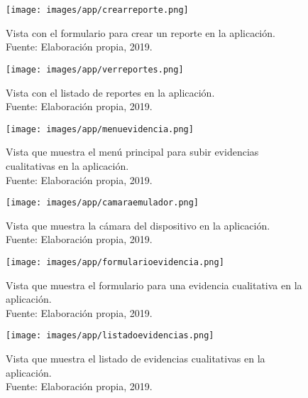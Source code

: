 \begin{figure}[H]
	\centering
	\captionsetup{justification=centering}
	\texttt{[image: images/app/crearreporte.png]}
	\caption[Vista con el formulario para crear un reporte en la aplicación.]{{Vista con el formulario para crear un reporte en la aplicación.\\Fuente: Elaboración propia, 2019.}}
\end{figure}

\begin{figure}[H]
	\centering
	\captionsetup{justification=centering}
	\texttt{[image: images/app/verreportes.png]}
	\caption[Vista con el listado de reportes en la aplicación.]{{Vista con el listado de reportes en la aplicación.\\Fuente: Elaboración propia, 2019.}}
\end{figure}

\begin{figure}[H]
	\centering
	\captionsetup{justification=centering}
	\texttt{[image: images/app/menuevidencia.png]}
	\caption[Vista que muestra el menú principal para subir evidencias cualitativas en la aplicación.]{{Vista que muestra el menú principal para subir evidencias cualitativas en la aplicación.\\Fuente: Elaboración propia, 2019.}}
\end{figure}

\begin{figure}[H]
	\centering
	\captionsetup{justification=centering}
	\texttt{[image: images/app/camaraemulador.png]}
	\caption[Vista que muestra la cámara del dispositivo en la aplicación.]{{Vista que muestra la cámara del dispositivo en la aplicación.\\Fuente: Elaboración propia, 2019.}}
\end{figure}

\begin{figure}[H]
	\centering
	\captionsetup{justification=centering}
	\texttt{[image: images/app/formularioevidencia.png]}
	\caption[Vista que muestra el formulario para una evidencia cualitativa en la aplicación.]{{Vista que muestra el formulario para una evidencia cualitativa en la aplicación.\\Fuente: Elaboración propia, 2019.}}
\end{figure}

\begin{figure}[H]
	\centering
	\captionsetup{justification=centering}
	\texttt{[image: images/app/listadoevidencias.png]}
	\caption[Vista que muestra el listado de evidencias cualitativas en la aplicación.]{{Vista que muestra el listado de evidencias cualitativas en la aplicación.\\Fuente: Elaboración propia, 2019.}}
\end{figure}

